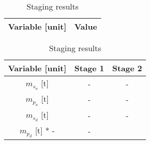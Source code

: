 
\begin{table}[H]
    \centering
    \begin{minipage}{0.45\textwidth}
        \centering
        \caption{Staging inputs}
        \begin{tabular}{|c|c|}
             \hline
             Variable [unit] & Value \\ \hline
             \hline
        \end{tabular}
        \label{tab:staging_inputs}
    \end{minipage}%
    \hspace{0.05\textwidth}
    \begin{minipage}{0.45\textwidth}
        \centering
        \caption{Staging results}
        \begin{tabular}{|c|c|c|}
            \hline
             Variable [unit] & Stage 1 & Stage 2 \\ \hline
             $m_{s_a}$ [t] & - & - \\
             $m_{p_a}$ [t] & - & - \\
             $m_{s_d}$ [t] & - & - \\
             $m_{p_d}$ [t] * - & - \\
        \end{tabular}
        \label{tab:staging_results}
    \end{minipage}
\end{table}

